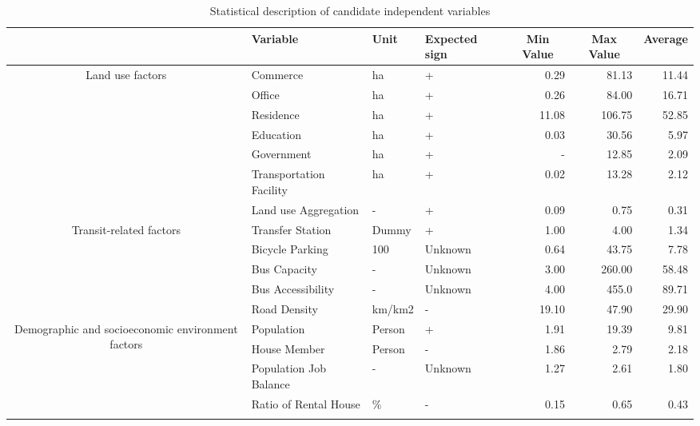 \documentclass[utf8]{article}
\begin{document}
\begin{table} %
	\centering
	\caption{Statistical description of candidate independent variables}
	\label{tab:StatisticalDescription} %
	\begin{tabular}{clllrrr}
		\Xhline{1.5pt}
		
		\multicolumn{1}{c}{Category} & %
		\multicolumn{1}{l}{Variable} &
		\multicolumn{1}{l}{Unit} &
		\multicolumn{1}{l}{Expected sign} &
		\multicolumn{1}{c}{Min Value} &	
		\multicolumn{1}{c}{Max Value} &	
		\multicolumn{1}{c}{Average}\\
		\midrule
		
		\multirow{7}{90pt}{\centering Land use factors} %
		& Commerce & ha & + & 0.29 & 81.13 & 11.44 \\
		& Office & ha & + & 0.26  & 84.00 & 16.71 \\
		& Residence & ha & + & 11.08 & 106.75 & 52.85 \\
		& Education & ha & + & 0.03 & 30.56 & 5.97 \\
		& Government & ha & + & - & 12.85 & 2.09 \\
		& Transportation Facility & ha & + & 0.02 & 13.28 & 2.12 \\
		& Land use Aggregation & - & + & 0.09 & 0.75 & 0.31 \\
		\cmidrule{2-7} 		%
		
		\multirow{5}{90pt}{\centering Transit-related factors}
		& Transfer Station & Dummy & + & 1.00 & 4.00 & 1.34 \\
		& Bicycle Parking & 100 & Unknown & 0.64 & 43.75 & 7.78 \\
		& Bus Capacity & - & Unknown & 3.00 & 260.00 & 58.48 \\
		& Bus Accessibility & - & Unknown & 4.00 & 455.0 & 89.71 \\
		& Road Density & km/km2 & - & 19.10 & 47.90 & 29.90 \\
		\cmidrule{2-7}
		
		\multirow{4}{90pt}{\centering Demographic and socioeconomic environment factors} 
		& Population & Person & + & 1.91 & 19.39 & 9.81 \\
		& House Member & Person & - & 1.86 & 2.79 & 2.18 \\
		& Population Job Balance & - & Unknown & 1.27 & 2.61 & 1.80 \\
		& Ratio of Rental House & \% & - & 0.15 & 0.65 & 0.43 \\
		\Xhline{1.5pt}
	\end{tabular}
\end{table}
\end{document}
